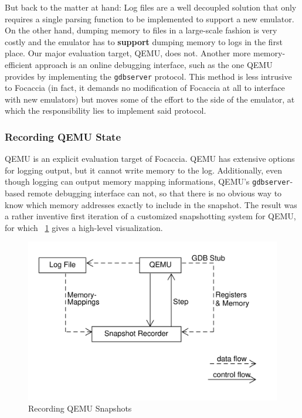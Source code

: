 But back to the matter at hand: Log files are a well decoupled solution that only requires a single parsing function to
be implemented to support a new emulator. On the other hand, dumping memory to files in a large-scale fashion is very
costly and the emulator has to \textbf{support} dumping memory to logs in the first place. Our major evaluation target,
QEMU, does not. Another more memory-efficient approach is an online debugging interface, such as the one QEMU provides
by implementing the \texttt{gdbserver} protocol. This method is less intrusive to Focaccia (in fact, it demands no
modification of Focaccia at all to interface with new emulators) but moves some of the effort to the side of the
emulator, at which the responsibility lies to implement said protocol.

\subsubsection{Recording QEMU State}

QEMU is an explicit evaluation target of Focaccia. QEMU has extensive options for logging output, but it cannot write
memory to the log. Additionally, even though logging can output memory mapping informations, QEMU's
\texttt{gdbserver}-based remote debugging interface can not, so that there is no obvious way to know which memory
addresses exactly to include in the snapshot. The result was a rather inventive first iteration of a customized
snapshotting system for QEMU, for which \figurename~\ref{fig:qemu_naive_recording} gives a high-level visualization.

\begin{figure}[htpb]
    \centering
    \includegraphics[width=0.8\linewidth]{figures/qemu_naive_recording.png}
    \caption{Recording QEMU Snapshots}\label{fig:qemu_naive_recording}
\end{figure}

